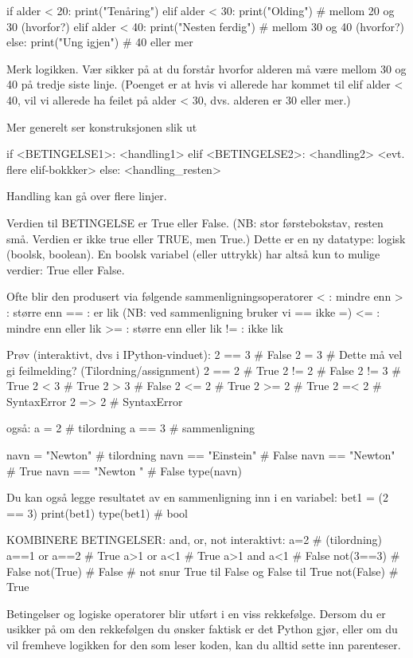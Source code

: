 \documentclass[a4paper,11pt,utf8]{book}
\begin{document}
if alder < 20: 
   print("Tenåring")
elif alder < 30:           
   print("Olding")         # mellom 20 og 30 (hvorfor?) 
elif alder < 40: 
   print("Nesten ferdig")  # mellom 30 og 40 (hvorfor?)
else: 
   print("Ung igjen")  # 40 eller mer 

Merk logikken.
Vær sikker på at du forstår hvorfor alderen må være mellom 30 og 40
på tredje siste linje.
(Poenget er at hvis vi allerede har kommet til elif alder < 40, vil vi allerede
ha feilet på alder < 30, dvs. alderen er 30 eller mer.) 


Mer generelt ser konstruksjonen slik ut

if <BETINGELSE1>: 
   <handling1>
elif <BETINGELSE2>: 
   <handling2>
<evt. flere elif-bokkker>
else: 
   <handling_resten>


Handling kan gå over flere linjer. 


Verdien til BETINGELSE er True eller False.
(NB: stor førstebokstav, resten små. Verdien er ikke true eller TRUE, men True.)
Dette er en ny datatype: logisk (boolsk, boolean).
En boolsk variabel (eller uttrykk) har altså kun to mulige verdier: True eller False. 

Ofte blir den produsert via følgende sammenligningsoperatorer 
 <  : mindre enn
 >  : større enn
 == : er lik  (NB: ved sammenligning bruker vi == ikke =)
 <= : mindre enn eller lik
 >= : større enn eller lik 
 != : ikke lik


Prøv (interaktivt, dvs i IPython-vinduet): 
2 == 3   # False
2 = 3    # Dette må vel gi feilmelding? (Tilordning/assignment)
2 == 2   # True
2 != 2   # False
2 != 3   # True
2 < 3    # True
2 > 3    # False
2 <= 2   # True
2 >= 2   # True
2 =< 2   # SyntaxError
2 => 2   # SyntaxError

også:
a = 2    # tilordning
a == 3   # sammenligning

navn = "Newton"       # tilordning
navn == "Einstein"    # False 
navn == "Newton"      # True
navn == "Newton "     # False
type(navn)

Du kan også legge resultatet av en sammenligning inn i en variabel:
bet1 = (2 == 3)   
print(bet1)
type(bet1)   # bool


KOMBINERE BETINGELSER: and, or, not 
interaktivt: 
a=2             # (tilordning)
a==1 or a==2    # True 
a>1  or  a<1    # True 
a>1  and a<1    # False
not(3==3)       # False
not(True)       # False  # not snur True til False og False til True
not(False)      # True 



Betingelser og logiske operatorer blir utført i en viss rekkefølge.
Dersom du er usikker på om den rekkefølgen du ønsker faktisk er det Python gjør,
eller om du vil fremheve logikken for den som leser koden, 
kan du alltid sette inn parenteser.
\end{document}
